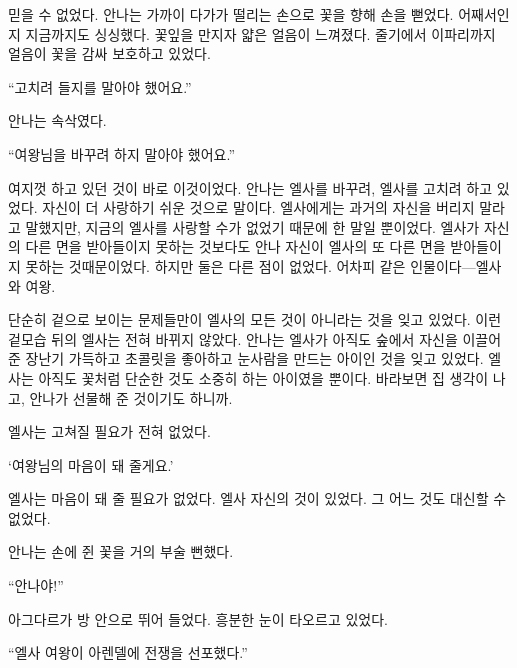 믿을 수 없었다. 안나는 가까이 다가가 떨리는 손으로 꽃을 향해 손을 뻗었다. 어째서인지 지금까지도 싱싱했다. 꽃잎을 만지자 얇은 얼음이 느껴졌다. 줄기에서 이파리까지 얼음이 꽃을 감싸 보호하고 있었다.

``고치려 들지를 말아야 했어요.''

안나는 속삭였다.

``여왕님을 바꾸려 하지 말아야 했어요.''

여지껏 하고 있던 것이 바로 이것이었다. 안나는 엘사를 바꾸려, 엘사를 고치려 하고 있었다. 자신이 더 사랑하기 쉬운 것으로 말이다. 엘사에게는 과거의 자신을 버리지 말라고 말했지만, 지금의 엘사를 사랑할 수가 없었기 때문에 한 말일 뿐이었다. 엘사가 자신의 다른 면을 받아들이지 못하는 것보다도 안나 자신이 엘사의 또 다른 면을 받아들이지 못하는 것때문이었다. 하지만 둘은 다른 점이 없었다. 어차피 같은 인물이다—엘사와 여왕.

단순히 겉으로 보이는 문제들만이 엘사의 모든 것이 아니라는 것을 잊고 있었다. 이런 겉모습 뒤의 엘사는 전혀 바뀌지 않았다. 안나는 엘사가 아직도 숲에서 자신을 이끌어 준 장난기 가득하고 초콜릿을 좋아하고 눈사람을 만드는 아이인 것을 잊고 있었다. 엘사는 아직도 꽃처럼 단순한 것도 소중히 하는 아이였을 뿐이다. 바라보면 집 생각이 나고, 안나가 선물해 준 것이기도 하니까.

엘사는 고쳐질 필요가 전혀 없었다.

`여왕님의 마음이 돼 줄게요.'

엘사는 마음이 돼 줄 필요가 없었다. 엘사 자신의 것이 있었다. 그 어느 것도 대신할 수 없었다.

안나는 손에 쥔 꽃을 거의 부술 뻔했다.

``안나야!''

아그다르가 방 안으로 뛰어 들었다. 흥분한 눈이 타오르고 있었다.

``엘사 여왕이 아렌델에 전쟁을 선포했다.''

